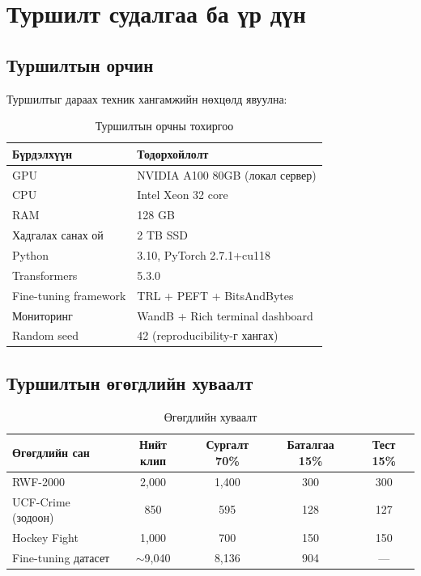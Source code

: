 
\chapter{Туршилт судалгаа ба үр дүн}

\section{Туршилтын орчин}

Туршилтыг дараах техник хангамжийн нөхцөлд явуулна:

\begin{table}[h]
\centering
\caption{Туршилтын орчны тохиргоо}
\label{tab:experiment_env}
\begin{tabular}{ll}
\hline
\textbf{Бүрдэлхүүн} & \textbf{Тодорхойлолт} \\
\hline
GPU                    & NVIDIA A100 80GB (локал сервер) \\
CPU                    & Intel Xeon 32 core \\
RAM                    & 128 GB \\
Хадгалах санах ой      & 2 TB SSD \\
Python                 & 3.10, PyTorch 2.7.1+cu118 \\
Transformers           & 5.3.0 \\
Fine-tuning framework  & TRL + PEFT + BitsAndBytes \\
Мониторинг             & WandB + Rich terminal dashboard \\
Random seed            & 42 (reproducibility-г хангах) \\
\hline
\end{tabular}
\end{table}

\section{Туршилтын өгөгдлийн хуваалт}

\begin{table}[h]
\centering
\caption{Өгөгдлийн хуваалт}
\label{tab:data_split}
\begin{tabular}{lcccc}
\hline
\textbf{Өгөгдлийн сан} & \textbf{Нийт клип} & \textbf{Сургалт 70\%} & \textbf{Баталгаа 15\%} & \textbf{Тест 15\%} \\
\hline
RWF-2000            & 2,000       & 1,400 & 300 & 300 \\
UCF-Crime (зодоон)  & 850         & 595   & 128 & 127 \\
Hockey Fight        & 1,000       & 700   & 150 & 150 \\
Fine-tuning датасет & $\sim$9,040 & 8,136 & 904 & ---  \\
\hline
\end{tabular}
\end{table}

